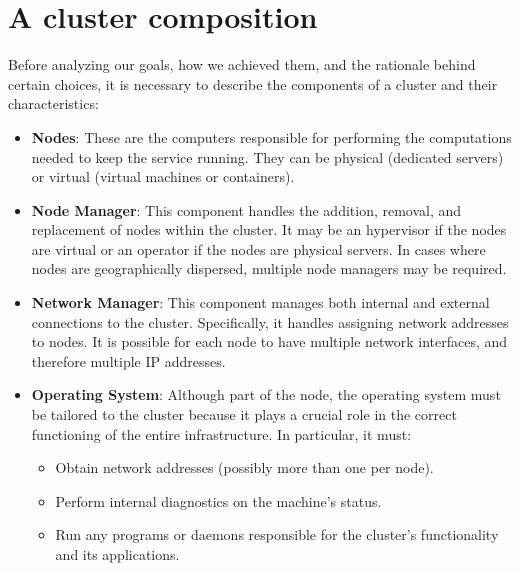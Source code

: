 \section{A cluster composition}
Before analyzing our goals, how we achieved them, and the rationale behind certain 
choices, it is necessary to describe the components of a cluster and their characteristics:
\begin{itemize}
	\item \textbf{Nodes}: These are the computers responsible for performing the computations
    needed to keep the service running. They can be physical (dedicated servers) or 
    virtual (virtual machines or containers).
	
	\item \textbf{Node Manager}: This component handles the addition, removal, and 
    replacement of nodes within the cluster. It may be an hypervisor if the nodes are 
    virtual or an operator if the nodes are physical servers. In cases where nodes 
    are geographically dispersed, multiple node managers may be required.	
	
	\item \textbf{Network Manager}: This component manages both internal and external 
    connections to the cluster. Specifically, it handles assigning network addresses 
    to nodes. It is possible for each node to have multiple network interfaces, and 
    therefore multiple IP addresses.
	
	\item \textbf{Operating System}: Although part of the node, the operating system 
    must be tailored to the cluster because it plays a crucial role in the correct 
    functioning of the entire infrastructure. In particular, it must:
	\begin{itemize}
		\item Obtain network addresses (possibly more than one per node).
		\item Perform internal diagnostics on the machine's status.
		\item Run any programs or daemons responsible for the cluster's functionality 
      and its applications.
	\end{itemize}
\end{itemize}
